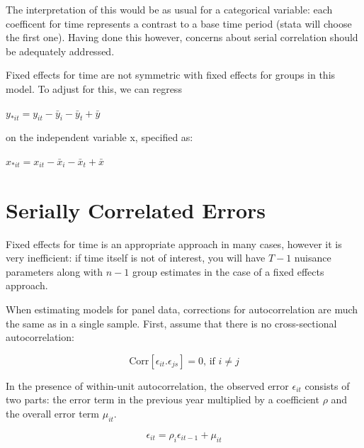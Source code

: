 \documentclass[12pt]{article}
\begin{document}
The interpretation of this would be as usual for a categorical
variable: each coefficent for time represents a contrast to a base
time period (stata will choose the first one). Having done this
however, concerns about serial correlation should be adequately
addressed. 






Fixed effects for time are not symmetric with fixed effects for groups
in this model. To adjust for this, we can regress 

$y_{*it}= y_{it}-\bar{y}_{i}-\bar{y}_{t}+\bar{y}$

on the independent variable x, specified as: 

$x_{*it}= x_{it}-\bar{x}_{i}-\bar{x}_{t}+\bar{x}$


\section{Serially Correlated Errors}

Fixed effects for time is an appropriate approach in many cases,
however it is very inefficient: if time itself is not of interest, you
will have $T-1$ nuisance parameters along with $n-1$ group estimates
in the case of a fixed effects approach. 

When estimating models for panel data, corrections for autocorrelation
are much the same as in a single sample. First, assume that there is
no cross-sectional autocorrelation:

\begin{equation*}
  \label{eq:noauto}
  \text{Corr}[\epsilon_{it}.\epsilon_{js}]=0 \text{, if } i \neq j
\end{equation*}

In the presence of within-unit autocorrelation, the observed error $\epsilon_{it}$
consists of two parts: the error term in the previous year multiplied
by a coefficient $\rho$ and the overall error term $\mu_{it}$.

\begin{equation*}
  \label{eq:ar1}
  \epsilon_{it}=\rho_i \epsilon_{it-1}+\mu_{it}
\end{equation*}
\end{document}
